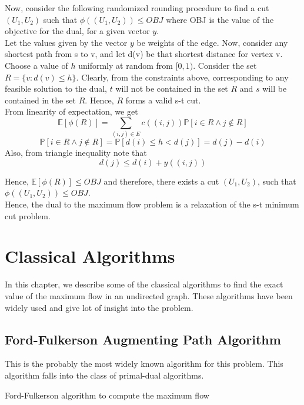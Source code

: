 \documentclass[BTech]{iitmdiss}
\begin{document}
	  Now, consider the following randomized rounding procedure to find a cut $(U_1, U_2)$ such that $\phi((U_1, U_2)) \leq OBJ$ where OBJ is 
	  the value of the objective for the dual, for a given vector $y$. \\
	  
	  Let the values given by the vector $y$ be weights of the edge. Now, consider any shortest path from s to v, and let d(v) be that 
	  shortest distance for vertex v. Choose a value of $h$ uniformly at random from $[0,1)$. Consider the set 
	  $R = \{v:d(v) \leq h\}$. Clearly, from the constraints above, corresponding to any feasible solution to the dual, $t$ will not be contained 
	  in the set $R$ and $s$ will be contained in the set $R$. Hence, $R$ forms a valid s-t cut. \\
	  
	  From linearity of expectation, we get
	  $$\mathbb{E}[\phi(R)] = \displaystyle\sum_{(i,j) \in E} c((i,j)) \mathbb{P}[i \in R \wedge j \notin R]$$
	  $$\mathbb{P}[i \in R \wedge j \notin R] = \mathbb{P}[d(i) \leq h < d(j)] = d(j)-d(i)$$
	  Also, from triangle inequality note that 
	  $$d(j) \leq d(i) + y((i,j))$$
	  
	  Hence, $\mathbb{E}[\phi(R)] \leq OBJ$ and therefore, there exists a cut $(U_1,U_2)$, such that $\phi((U_1, U_2)) \leq OBJ$. \\
	  
	  Hence, the dual to the maximum flow problem is a relaxation of the s-t minimum cut problem.


	 \chapter{Classical Algorithms}
	  In this chapter, we describe some of the classical algorithms to find the exact value of the maximum flow in an undirected graph. These
	  algorithms have been widely used and give lot of insight into the problem. 
	  
	  \section{Ford-Fulkerson Augmenting Path Algorithm}
	    This is the probably the most widely known algorithm for this problem. This algorithm falls into the class of primal-dual algorithms.
	    

	    \begin{algorithm}[H]

		\caption{Ford-Fulkerson algorithm to compute the maximum flow}
	    \end{algorithm}
	    
\end{document}
